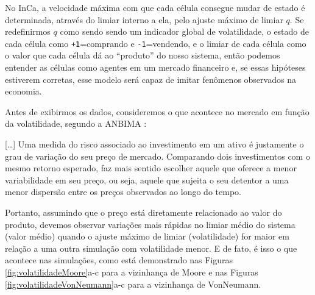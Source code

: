 \documentclass[
	12pt,				%
	openright,			%
	twoside,			%
	a4paper,			%
	english,			%
	french,				%
	spanish,			%
	brazil				%
	]{abntex2}
\begin{document}
No InCa, a velocidade máxima com que cada célula consegue mudar de estado é determinada, através do limiar interno a ela, pelo ajuste máximo de limiar $q$. Se redefinirmos $q$ como sendo sendo um indicador global de volatilidade, o estado de cada célula como \texttt{+1}=comprando e \texttt{-1}=vendendo, e o limiar de cada célula como o valor que cada célula dá ao ``produto'' do nosso sistema, então podemos entender as células como agentes em um mercado financeiro e, se essas hipóteses estiverem corretas, esse modelo será capaz de imitar fenômenos observados na economia.

Antes de exibirmos os dados, consideremos o que acontece no mercado em função da volatilidade, segundo a ANBIMA \cite{anbima3}:
\begin{citacao}
 {}[\dots] Uma medida do risco
associado ao investimento em um ativo é justamente o grau de variação do seu preço de
mercado. Comparando dois investimentos com o mesmo retorno esperado, faz mais sentido
escolher aquele que oferece a menor variabilidade em seu preço, ou seja, aquele que sujeita o
seu detentor a uma menor dispersão entre os preços observados ao longo do tempo. \cite{anbima3}
\end{citacao}
Portanto, assumindo que o preço está diretamente relacionado ao valor do produto, devemos observar variações mais rápidas no limiar médio do sistema (valor médio) quando o ajuste máximo de limiar (volatilidade) for maior em relação a uma outra simulação com volatilidade menor. E de fato, é isso o que acontece nas simulações, como está demonstrado nas Figuras \ref{fig:volatilidadeMoore}a-c para a vizinhança de Moore e nas Figuras \ref{fig:volatilidadeVonNeumann}a-c para a vizinhança de VonNeumann.
\end{document}
